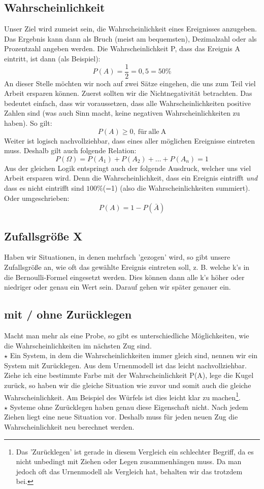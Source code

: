 \subsection{Wahrscheinlichkeit}
Unser Ziel wird zumeist sein, die Wahrscheinlichkeit eines Ereignisses anzugeben. Das Ergebnis kann dann als Bruch (meist am bequemsten), Dezimalzahl oder als Prozentzahl angeben werden. Die Wahrscheinlichkeit P, dass das Ereignis A eintritt, ist dann (als Beispiel):
\[P(A)=\frac{1}{2}=0,5=50\%\]
An dieser Stelle möchten wir noch auf zwei Sätze eingehen, die uns zum Teil viel Arbeit ersparen können. Zuerst sollten wir die Nichtnegativität betrachten. Das bedeutet einfach, dass wir voraussetzen, dass alle Wahrscheinlichkeiten positive Zahlen sind (was auch Sinn macht, keine negativen Wahrscheinlichkeiten zu haben). So gilt:
\[P(A)\geq 0 \mathrm{,\ für\ alle\ A}\]
Weiter ist logisch nachvollziehbar, dass eines aller möglichen Ereignisse eintreten muss. Deshalb gilt auch folgende Relation:
\[P(\Omega)=P(A_1)+P(A_2)+ \ldots+ P(A_n)=1\]
Aus der gleichen Logik entspringt auch der folgende Ausdruck, welcher uns viel Arbeit ersparen wird. Denn die Wahrscheinlichkeit, dass ein Ereignis eintrifft \emph{und} dass es nicht eintrifft sind \(100\%\)(=1) (also die Wahrscheinlichkeiten summiert). Oder umgeschrieben:
\[P(A)=1-P(\bar{A})\]

\subsection{Zufallsgröße X}
Haben wir Situationen, in denen mehrfach 'gezogen' wird, so gibt unsere Zufallsgröße an, wie oft das gewählte Ereignis eintreten soll, z. B. welche k's in die Bernoulli-Formel eingesetzt werden. Dies können dann alle k's höher oder niedriger oder genau ein Wert sein. Darauf gehen wir später genauer ein.

\subsection{mit / ohne Zurücklegen}
Macht man mehr als eine Probe, so gibt es unterschiedliche Möglichkeiten, wie die Wahrscheinlichkeiten im nächsten Zug sind.\\
\(\star\) Ein System, in dem die Wahrscheinlichkeiten immer gleich sind, nennen wir ein System mit Zurücklegen. Aus dem Urnenmodell ist das leicht nachvollziehbar. Ziehe ich eine bestimmte Farbe mit der Wahrscheinlichkeit P(A), lege die Kugel zurück, so haben wir die gleiche Situation wie zuvor und somit auch die gleiche Wahrscheinlichkeit. Am Beispiel des Würfels ist dies leicht klar zu machen\footnote{Das 'Zurücklegen' ist gerade in diesem Vergleich ein schlechter Begriff, da es nicht unbedingt mit Ziehen oder Legen zusammenhängen muss. Da man jedoch oft das Urnenmodell als Vergleich hat, behalten wir das trotzdem bei.}.\\
\(\star\) Systeme ohne Zurücklegen haben genau diese Eigenschaft nicht. Nach jedem Ziehen liegt eine neue Situation vor. Deshalb muss für jeden neuen Zug die Wahrscheinlichkeit neu berechnet werden.


